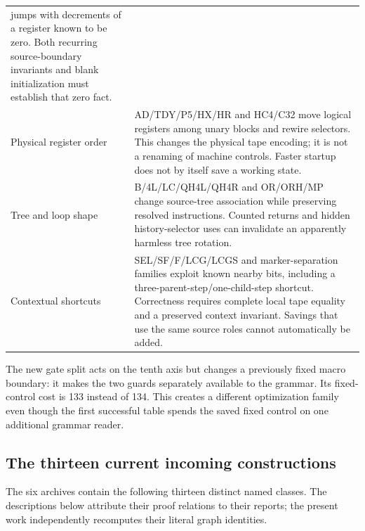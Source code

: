 \documentclass[10pt,a4paper]{article}
\theoremstyle{definition}
\begin{document}
\begin{longtable}{@{}>{\raggedright\arraybackslash}p{}>{\raggedright\arraybackslash}p{}@{}}
jumps with decrements of a register known to be zero. Both recurring
source-boundary invariants and blank initialization must establish that
zero fact.\\
Physical register order & AD/TDY/P5/HX/HR and HC4/C32 move logical registers
among unary blocks and rewire selectors. This changes the physical tape
encoding; it is not a renaming of machine controls. Faster startup does
not by itself save a working state.\\
Tree and loop shape & B/4L/LC/QH4L/QH4R and OR/ORH/MP change source-tree
association while preserving resolved instructions. Counted returns and
hidden history-selector uses can invalidate an apparently harmless tree
rotation.\\
Contextual shortcuts & SEL/SF/F/LCG/LCGS and marker-separation families
exploit known nearby bits, including a three-parent-step/one-child-step
shortcut. Correctness requires complete local tape equality and a
preserved context invariant. Savings that use the same source roles
cannot automatically be added.\\
\end{longtable}

The new gate split acts on the tenth axis but changes a previously fixed
macro boundary: it makes the two guards separately available to the
grammar. Its fixed-control cost is 133 instead of 134. This creates a
different optimization family even though the first successful table
spends the saved fixed control on one additional grammar reader.

\subsection{The thirteen current incoming constructions}

The six archives contain the following thirteen distinct named classes.
The descriptions below attribute their proof relations to their reports;
the present work independently recomputes their literal graph identities.
\end{document}
